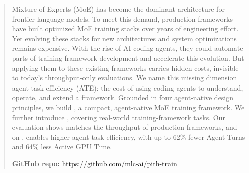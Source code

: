 
\begin{abstract}
Mixture-of-Experts (MoE) has become the dominant architecture for
frontier language models.
To meet this demand, production frameworks have built optimized
MoE training stacks over years of engineering effort.
Yet evolving these stacks for new architectures and system
optimizations remains expensive.
With the rise of AI coding agents, they could automate parts of
training-framework development and accelerate this evolution.
But applying them to these existing frameworks carries hidden
costs, invisible to today's throughput-only evaluations.
We name this missing dimension agent-task efficiency (ATE): the
cost of using coding agents to understand, operate, and extend a
framework.
Grounded in four agent-native design principles, we build \sys,
a compact, agent-native MoE training framework.
We further introduce \sysbench, covering real-world
training-framework tasks.
Our evaluation shows \sys matches the throughput of production
frameworks, and on \sysbench, \sys enables higher agent-task
efficiency, with up to 62\% fewer Agent Turns and 64\%
less Active GPU Time.

\vspace{1ex}
\noindent \textbf{GitHub repo:} \url{https://github.com/mlc-ai/pith-train}
\end{abstract}

